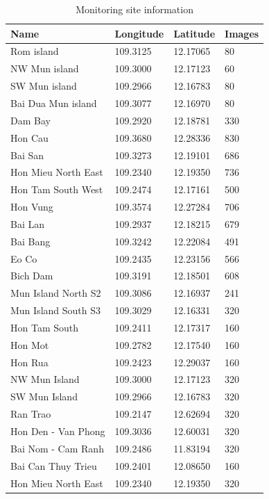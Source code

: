 \documentclass[
  letterpaper,
  DIV=11,
  numbers=noendperiod]{scrartcl}
\begin{document}
\begin{longtable}[]{@{}llll@{}}

\caption{\label{tbl-surveyed_sites}Monitoring site information}

\tabularnewline

\toprule\noalign{}
Name & Longitude & Latitude & Images \\
\midrule\noalign{}
\endhead
\bottomrule\noalign{}
\endlastfoot
Rom island & 109.3125 & 12.17065 & 80 \\
NW Mun island & 109.3000 & 12.17123 & 60 \\
SW Mun island & 109.2966 & 12.16783 & 80 \\
Bai Dua Mun island & 109.3077 & 12.16970 & 80 \\
Dam Bay & 109.2920 & 12.18781 & 330 \\
Hon Cau & 109.3680 & 12.28336 & 830 \\
Bai San & 109.3273 & 12.19101 & 686 \\
Hon Mieu North East & 109.2340 & 12.19350 & 736 \\
Hon Tam South West & 109.2474 & 12.17161 & 500 \\
Hon Vung & 109.3574 & 12.27284 & 706 \\
Bai Lan & 109.2937 & 12.18215 & 679 \\
Bai Bang & 109.3242 & 12.22084 & 491 \\
Eo Co & 109.2435 & 12.23156 & 566 \\
Bich Dam & 109.3191 & 12.18501 & 608 \\
Mun Island North S2 & 109.3086 & 12.16937 & 241 \\
Mun Island South S3 & 109.3029 & 12.16331 & 320 \\
Hon Tam South & 109.2411 & 12.17317 & 160 \\
Hon Mot & 109.2782 & 12.17540 & 160 \\
Hon Rua & 109.2423 & 12.29037 & 160 \\
NW Mun Island & 109.3000 & 12.17123 & 320 \\
SW Mun Island & 109.2966 & 12.16783 & 320 \\
Ran Trao & 109.2147 & 12.62694 & 320 \\
Hon Den - Van Phong & 109.3036 & 12.60031 & 320 \\
Bai Nom - Cam Ranh & 109.2486 & 11.83194 & 320 \\
Bai Can Thuy Trieu & 109.2401 & 12.08650 & 160 \\
Hon Mieu North East & 109.2340 & 12.19350 & 320 \\

\end{longtable}
\end{document}
